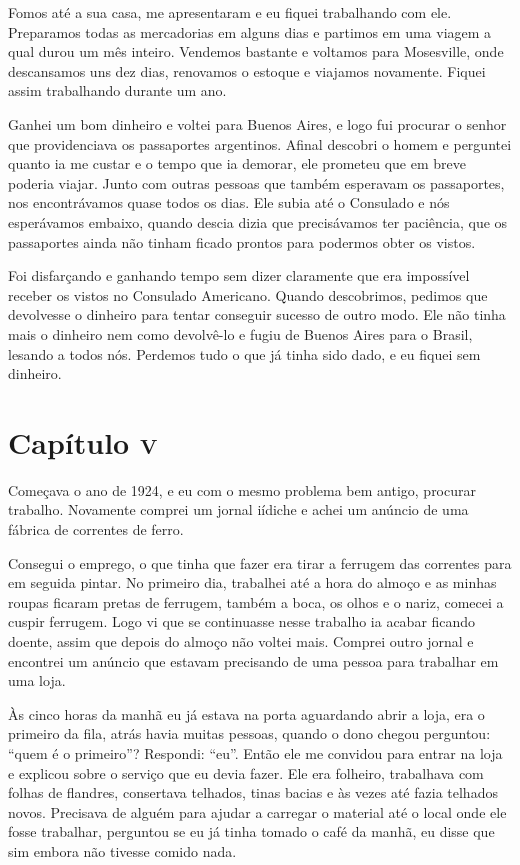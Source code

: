 Fomos até a sua casa, me apresentaram e eu fiquei trabalhando com ele.
Preparamos todas as mercadorias em alguns dias e partimos em uma viagem
a qual durou um mês inteiro. Vendemos bastante e voltamos para
Mosesville, onde descansamos uns dez dias, renovamos o estoque e
viajamos novamente. Fiquei assim trabalhando durante um ano.

Ganhei um bom dinheiro e voltei para Buenos Aires, e logo fui procurar o
senhor que providenciava os passaportes argentinos. Afinal descobri o
homem e perguntei quanto ia me custar e o tempo que ia demorar, ele
prometeu que em breve poderia viajar. Junto com outras pessoas que
também esperavam os passaportes, nos encontrávamos quase todos os dias.
Ele subia até o Consulado e nós esperávamos embaixo, quando descia dizia
que precisávamos ter paciência, que os passaportes ainda não tinham
ficado prontos para podermos obter os vistos.

Foi disfarçando e ganhando tempo sem dizer claramente que era impossível
receber os vistos no Consulado Americano. Quando descobrimos, pedimos
que devolvesse o dinheiro para tentar conseguir sucesso de outro modo.
Ele não tinha mais o dinheiro nem como devolvê-lo e fugiu de Buenos
Aires para o Brasil, lesando a todos nós. Perdemos tudo o que já tinha
sido dado, e eu fiquei sem dinheiro.

\chapter{Capítulo \textsc{v}}

Começava o ano de 1924, e eu com o mesmo problema bem antigo, procurar
trabalho. Novamente comprei um jornal iídiche e achei um anúncio de uma
fábrica de correntes de ferro.

Consegui o emprego, o que tinha que fazer era tirar a ferrugem das
correntes para em seguida pintar. No primeiro dia, trabalhei até a hora
do almoço e as minhas roupas ficaram pretas de ferrugem, também a boca,
os olhos e o nariz, comecei a cuspir ferrugem. Logo vi que se
continuasse nesse trabalho ia acabar ficando doente, assim que depois do
almoço não voltei mais. Comprei outro jornal e encontrei um anúncio que
estavam precisando de uma pessoa para trabalhar em uma loja.

Às cinco horas da manhã eu já estava na porta aguardando abrir a loja,
era o primeiro da fila, atrás havia muitas pessoas, quando o dono chegou
perguntou: ``quem é o primeiro''? Respondi: ``eu''. Então ele me
convidou para entrar na loja e explicou sobre o serviço que eu devia
fazer. Ele era folheiro, trabalhava com folhas de flandres, consertava
telhados, tinas bacias e às vezes até fazia telhados novos. Precisava de
alguém para ajudar a carregar o material até o local onde ele fosse
trabalhar, perguntou se eu já tinha tomado o café da manhã, eu disse que
sim embora não tivesse comido nada.

